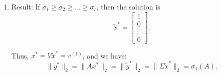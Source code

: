 \begin{derivation}
\begin{enumerate}
        \item Result:
        If \( \sigma_1 \geq \sigma_2 \geq \dots \geq \sigma_r \), then the solution is 
        \[
        \tilde{x}^* = 
        \begin{bmatrix}
            1 \\
            0 \\
            \vdots \\
            0
        \end{bmatrix}.
        \]
     
     Thus, \( x^* = V \tilde{x}^* = v^{(1)} \), and we have:
     \[
     \| y^* \|_2 = \| A x^* \|_2 = \| \tilde{y}^* \|_2 = \| \Sigma \tilde{x}^* \|_2 = \sigma_1(A).
     \]
    \end{enumerate}
\end{derivation}

